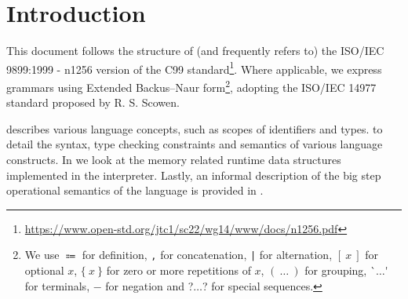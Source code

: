 \newpage
\section*{Introduction}\label{sec:intro}

This document follows the structure of (and frequently refers to) the ISO/IEC
9899:1999 - n1256 version of the C99 standard\footnote{\href{https://www.open-std.org/jtc1/sc22/wg14/www/docs/n1256.pdf}{https://www.open-std.org/jtc1/sc22/wg14/www/docs/n1256.pdf}}.
Where applicable, we express grammars using Extended Backus–Naur form\footnote{We use $\Coloneqq$ for definition, \lstinline{,} for concatenation, \lstinline{|} for alternation, $[\ x\ ]$ for optional $x$, $\{\ x\ \}$ for zero or more repetitions of $x$, $(\ \dots\ )$ for grouping, {\textsf `}$\dots${\textsf '} for terminals, $-$ for negation and {\textsf ?}$\dots${\textsf ?} for special sequences.}, adopting the ISO/IEC 14977 standard proposed by R. S. Scowen.
\par
{}
\vspace{10pt}
\par
{} describes various language concepts, such as scopes of identifiers and types.
 to  detail the syntax, type checking constraints and semantics of various language constructs.
In  we look at the memory related runtime data structures implemented in the interpreter.
Lastly, an informal description of the big step operational semantics of the language is provided in .
